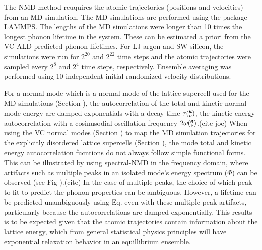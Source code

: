 \documentclass[aps,prb,twocolumn,superscriptaddress,amsmath,amssymb,floatfix]{revtex4}
\newcommand{\kv}{\mspace{-4.0mu}\left(\mspace{-8.0mu}
\begin{smallmatrix}&\pmb{\kappa} \\&\nu\end{smallmatrix}
\mspace{-3.0mu}\right)}
\begin{document}
The NMD method reuquires the atomic trajectories (positions and velocities) 
from an MD simulation. 
The MD simulations are performed using the package LAMMPS.
\cite{plimpton_fast_1995} The lengths of the MD simulations were longer 
than 10 times the longest phonon lifetime in the system. These can 
be estimated a priori from the VC-ALD predicted phonon lifetimes. For LJ 
argon and SW silicon, the simulations were run for $2^20$ and 
$2^22$ time steps and the atomic trajectories were sampled 
every $2^8$ and $2^4$ time steps, respectively. 
Ensemble averaging was performed using 10 independent initial 
randomized velocity distributions. 

For a normal mode which is a normal mode of the lattice supercell 
used for the MD simulations (Section ), 
the autocorrelation of the total and kinetic     
normal mode energy are damped exponentials 
with a decay time $\tau\kv$, the kinetic energy autocorrelation with a 
cosinusodial oscillation frequency 
$2\omega\kv$.(cite joe) 
When using the VC normal modes (Section ) to map the MD simulation 
trajectories for the explicitly disordered lattice supercells (Section ), 
the mode total and kinetic energy autocorrelation fucntions 
do not always follow simple functional forms. 
This can be illustrated by using spectral-NMD 
in the frequency domain, where artifacts such as 
multiple peaks in an isolated mode's 
energy spectrum ($\Phi$) can be observed (see Fig ).(cite)  
In the case 
of multiple peaks, the choice of which peak to fit to predict the phonon 
properties can be ambiguous.  However, 
a lifetime can be predicted unambiguously using Eq. even with 
these multiple-peak artifacts, particularly because the autocorrelations 
are damped exponentially. This results is to be expected 
given that the atomic trajectories contain 
information about the lattice energy, which from general statistical 
physics principles will have exponential relaxation behavior in an 
equillibrium ensemble.
\cite{srivastava_physics_1990,landau_statistical_1980,
rajabpour_thermal_2010}
\end{document}

